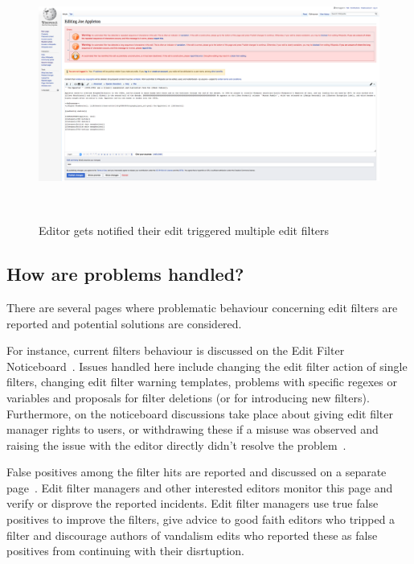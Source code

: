 \begin{figure}
\centering
  \includegraphics[width=0.9\columnwidth]{pics/screenshots-filter-trigger/Screenshot-trigger-warning-filter.png}
  \caption{Editor gets notified their edit triggered multiple edit filters}~\label{fig:screenshot-warn-disallow}
\end{figure}


\subsection{How are problems handled?}

There are several pages where problematic behaviour concerning edit filters are reported and potential solutions are considered.

For instance, current filters behaviour is discussed on the Edit Filter Noticeboard~\cite{Wikipedia:EditFilterNoticeboard}.
Issues handled here include changing the edit filter action of single filters, changing edit filter warning templates, problems with specific regexes or variables and proposals for filter deletions (or for introducing new filters).
Furthermore, on the noticeboard discussions take place about giving edit filter manager rights to users, or withdrawing these if a misuse was observed and raising the issue with the editor directly didn't resolve the problem~\cite{Wikipedia:EditFilter}.

False positives among the filter hits are reported and discussed on a separate page~\cite{Wikipedia:EditFilterFalsePositives}.
Edit filter managers and other interested editors monitor this page and verify or disprove the reported incidents.
Edit filter managers use true false positives to improve the filters, give advice to good faith editors who tripped a filter and discourage authors of vandalism edits who reported these as false positives from continuing with their disrtuption.

